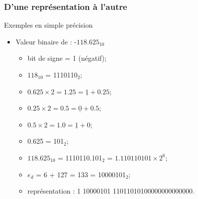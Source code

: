 \documentclass{beamer}
\begin{document}
\begin{frame}
	\frametitle{D'une représentation à l'autre}
	
	\begin{block}{Exemples en simple précision}
		\begin{itemize}
			\item Valeur binaire de : -$118.625_{10}$
			\begin{itemize}
				\item bit de signe = 1 (négatif);
				\item $118_{10}$ = 1110110$_2$;
				\item $0.625\times{}2=1.25=\underline{1}+0.25$;
				\item $0.25\times{}2=0.5=\underline{0}+0.5$;
				\item $0.5\times{}2=1.0=\underline{1}+0$;
				\item 0.625 = 101$_2$;
				\item $118.625_{10}$ = 1110110.101$_2$ = $1.110110101\times{}2^6$;
				\item $e_d$ = 6 + 127 = 133 = 10000101$_2$;
				\item représentation : 1 10000101 11011010100000000000000.
			\end{itemize}
		\end{itemize}
	\end{block}
\end{frame}


\end{document}
